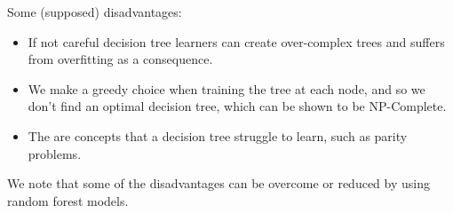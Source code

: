 \documentclass{article}
\newcommand{\vc}[1]{
    \mathbf{#1}
 }
\theoremstyle{definition}
\begin{document}
Some (supposed) disadvantages:
\begin{itemize}
    \item 
        If not careful decision tree learners can create over-complex trees and suffers from overfitting as a 
        consequence.
    \item 
        We make a greedy choice when training the tree at each node, and so we don't find an optimal decision tree, 
        which can be shown to be NP-Complete.
    \item 
        The are concepts that a decision tree struggle to learn, such as parity problems.
\end{itemize}

We note that some of the disadvantages can be overcome or reduced by using random forest models.

















\end{document}

